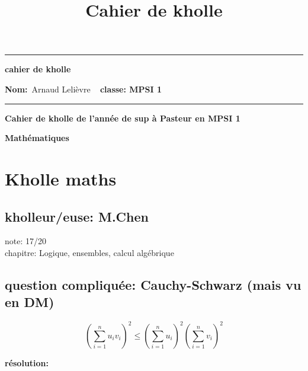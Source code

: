 \documentclass{article}
\title{Cahier de kholle}
\begin{document}
\begin{center}
  \hrule
	\vspace{.4cm}
	{\textbf{\large cahier de kholle}}
\end{center}

{\textbf{Nom:}\ Arnaud Lelièvre \hspace{\fill} \vspace{0.5cm}}
{\textbf{}\  \hspace{\fill} \vspace{0.5cm}}
{\textbf{classe: MPSI 1}\ \hspace{\fill}}
\hrule
\date{}

\vspace{1cm}

\begin{center}
\textbf{\large Cahier de kholle de l'année de sup à Pasteur en MPSI 1}
\end{center} \vspace{0.2cm}

\begin{center}
\textbf{\large Mathématiques}
\end{center} \vspace{0.2cm}

\section{Kholle maths}
\subsection{kholleur/euse: M.Chen}

note: 17/20 \\
chapitre: Logique, ensembles, calcul algébrique\\

\subsection{question compliquée: Cauchy-Schwarz (mais vu en DM)}

\vspace{5mm}

\begin{equation}
  \left(\sum_{i=1}^{n} u_i v_i \right)^2 \leqslant \left(\sum_{i=1}^{n} u_i\right)^2 \left(\sum_{i=1}^{n} v_i \right)^2
\end{equation}

\textbf{\large résolution:}
\vspace{5mm}
\end{document}
